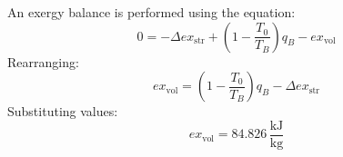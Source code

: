 An exergy balance is performed using the equation:  
\[
0 = -\Delta ex_{\text{str}} + \left( 1 - \frac{T_0}{T_B} \right) q_B - ex_{\text{vol}}
\]  
Rearranging:  
\[
ex_{\text{vol}} = \left( 1 - \frac{T_0}{T_B} \right) q_B - \Delta ex_{\text{str}}
\]  
Substituting values:  
\[
ex_{\text{vol}} = 84.826 \, \frac{\text{kJ}}{\text{kg}}
\]